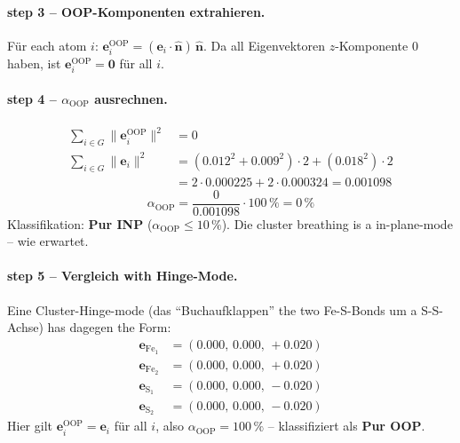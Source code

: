 \documentclass[11pt,a4paper,twoside]{article}
\newcommand{\OOP}{\mathrm{OOP}}
\theoremstyle{remark}
\begin{document}
\paragraph{step 3 -- OOP-Komponenten extrahieren.}
F\"ur each atom $i$:
$\mathbf{e}_i^\text{OOP} = (\mathbf{e}_i \cdot \hat{\mathbf{n}})\,
\hat{\mathbf{n}}$. Da all Eigenvektoren $z$-Komponente $0$ haben,
ist $\mathbf{e}_i^\text{OOP} = \mathbf{0}$ f\"ur all $i$.

\paragraph{step 4 -- $\alpha_{\OOP}$ ausrechnen.}
\begin{align*}
  \sum_{i \in G} \|\mathbf{e}_i^\text{OOP}\|^2 &= 0 \\
  \sum_{i \in G} \|\mathbf{e}_i\|^2 &= (0.012^2 + 0.009^2)\cdot 2 + (0.018^2)\cdot 2 \\
   &= 2\cdot 0.000225 + 2\cdot 0.000324 = 0.001098
\end{align*}
\begin{equation*}
  \alpha_{\OOP} = \frac{0}{0.001098}\cdot 100\,\% = 0\,\%
\end{equation*}
Klassifikation: \textbf{Pur INP} ($\alpha_{\OOP} \leq 10\,\%$). Die
cluster breathing is a in-plane-mode -- wie erwartet.

\paragraph{step 5 -- Vergleich with Hinge-Mode.}
Eine Cluster-Hinge-mode (das "`Buchaufklappen"' the two Fe-S-Bonds
um a S-S-Achse) has dagegen the Form:
\begin{align*}
  \mathbf{e}_{\text{Fe}_1} &= (0.000,\, 0.000,\, +0.020) \\
  \mathbf{e}_{\text{Fe}_2} &= (0.000,\, 0.000,\, +0.020) \\
  \mathbf{e}_{\text{S}_1}  &= (0.000,\, 0.000,\, -0.020) \\
  \mathbf{e}_{\text{S}_2}  &= (0.000,\, 0.000,\, -0.020)
\end{align*}
Hier gilt $\mathbf{e}_i^\text{OOP} = \mathbf{e}_i$ f\"ur all $i$,
also $\alpha_{\OOP} = 100\,\%$ -- klassifiziert als \textbf{Pur OOP}.
\end{document}
